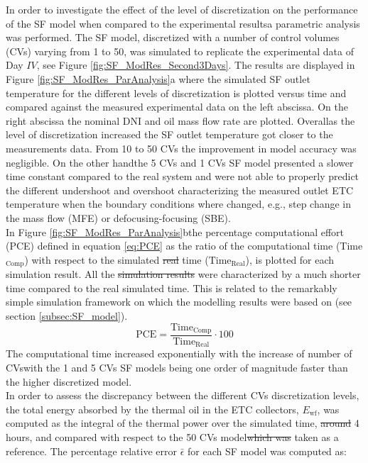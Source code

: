 \documentclass[final,3p,times,review]{elsarticle}
\providecommand{\DIFadd}[1]{{\protect\color{blue}\uwave{#1}}} %
\providecommand{\DIFdel}[1]{{\protect\color{red}\sout{#1}}}                      %
\providecommand{\DIFaddbegin}{} %
\providecommand{\DIFaddend}{} %
\providecommand{\DIFdelbegin}{} %
\providecommand{\DIFdelend}{} %
\begin{document}
In order to investigate the effect of the level of discretization on the performance of the SF model when compared to the experimental results\DIFaddbegin \DIFadd{, }\DIFaddend a parametric analysis was performed. The SF model, discretized with a number of control volumes (CVs) varying from 1 to 50,  was simulated to replicate the  experimental data of Day $IV$, see Figure \ref{fig:SF_ModRes_Second3Days}. The results are displayed in Figure \ref{fig:SF_ModRes_ParAnalysis}a where the simulated SF outlet temperature for the different levels of discretization is plotted versus time and compared against the measured experimental data on the left abscissa. On the right abscissa the nominal DNI and oil mass flow rate are plotted. Overall\DIFaddbegin \DIFadd{, }\DIFaddend as the level of discretization increased the SF outlet temperature got closer to the measurements data. From 10 to 50 CVs the improvement in model accuracy was negligible. On the other hand\DIFaddbegin \DIFadd{, }\DIFaddend the 5 CVs and 1 CVs SF model presented a slower time constant compared to the real system and were not able to properly predict the different undershoot and overshoot characterizing the measured outlet ETC temperature when the boundary conditions where changed, e.g., step change in the mass flow (MFE) or defocusing-focusing (SBE).\\
In Figure \ref{fig:SF_ModRes_ParAnalysis}b\DIFaddbegin \DIFadd{, }\DIFaddend the percentage computational effort (PCE) defined in equation \ref{eq:PCE} as the ratio of the computational time (Time$_\mathrm{Comp}$) with respect to the simulated \DIFdelbegin \DIFdel{real }\DIFdelend time ($\mathrm{Time}_\mathrm{Real}$), is plotted for each simulation result. All the \DIFdelbegin \DIFdel{simulation results }\DIFdelend \DIFaddbegin \DIFadd{simulations }\DIFaddend were characterized by a much shorter time compared to the real simulated time. This is related to the remarkably simple simulation framework on which the modelling results were based on (see section \ref{subsec:SF_model}). 
%
\begin{equation}
\mathrm{PCE} = \frac{\mathrm{Time}_\mathrm{Comp}}{\mathrm{Time}_\mathrm{Real}} \cdot 100
\label{eq:PCE}
\end{equation}
%
The computational time increased exponentially with the increase of number of CVs\DIFaddbegin \DIFadd{, }\DIFaddend with the 1 and 5 CVs SF models being one order of magnitude faster than the higher discretized model.\\
In order to assess the discrepancy between the different CVs discretization levels, the total energy absorbed by the thermal oil in the ETC collectors, $E_\mathrm{wf}$,  was computed as the integral of the thermal power over the simulated time, \DIFdelbegin \DIFdel{around }\DIFdelend \DIFaddbegin \DIFadd{over }\DIFaddend 4 hours, and compared with respect to the 50 CVs model\DIFdelbegin \DIFdel{which was }\DIFdelend \DIFaddbegin \DIFadd{, }\DIFaddend taken as a reference. The percentage relative error $\bar{\epsilon}$ for each SF model was computed as:
\end{document}
